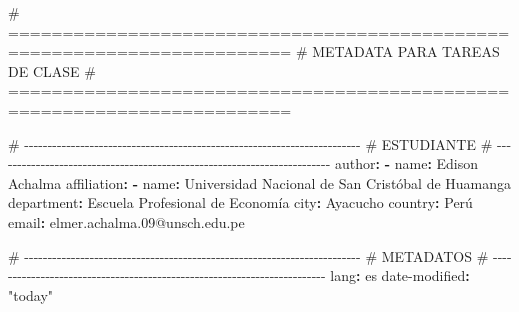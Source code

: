 \documentclass[
  doc,
  floatsintext,
  longtable,
  a4paper,
  nolmodern,
  notxfonts,
  notimes,
  12pt,
  colorlinks=true,linkcolor=blue,citecolor=blue,urlcolor=blue]{apa7}
\newenvironment{Shaded}{\begin{snugshade}}{\end{snugshade}}
\newcommand{\AttributeTok}[1]{\textcolor[rgb]{0.40,0.45,0.13}{#1}}
\newcommand{\CommentTok}[1]{\textcolor[rgb]{0.37,0.37,0.37}{#1}}
\newcommand{\FunctionTok}[1]{\textcolor[rgb]{0.28,0.35,0.67}{#1}}
\newcommand{\KeywordTok}[1]{\textcolor[rgb]{0.00,0.23,0.31}{\textbf{#1}}}
\newcommand{\StringTok}[1]{\textcolor[rgb]{0.13,0.47,0.30}{#1}}
\begin{document}
\begin{Shaded}
\begin{Highlighting}[]
\CommentTok{\# ========================================================================}
\CommentTok{\# METADATA PARA TAREAS DE CLASE}
\CommentTok{\# ========================================================================}

\CommentTok{\# {-}{-}{-}{-}{-}{-}{-}{-}{-}{-}{-}{-}{-}{-}{-}{-}{-}{-}{-}{-}{-}{-}{-}{-}{-}{-}{-}{-}{-}{-}{-}{-}{-}{-}{-}{-}{-}{-}{-}{-}{-}{-}{-}{-}{-}{-}{-}{-}{-}{-}{-}{-}{-}{-}{-}{-}{-}{-}{-}{-}{-}{-}{-}{-}{-}{-}{-}{-}{-}{-}{-}{-}}
\CommentTok{\# ESTUDIANTE}
\CommentTok{\# {-}{-}{-}{-}{-}{-}{-}{-}{-}{-}{-}{-}{-}{-}{-}{-}{-}{-}{-}{-}{-}{-}{-}{-}{-}{-}{-}{-}{-}{-}{-}{-}{-}{-}{-}{-}{-}{-}{-}{-}{-}{-}{-}{-}{-}{-}{-}{-}{-}{-}{-}{-}{-}{-}{-}{-}{-}{-}{-}{-}{-}{-}{-}{-}{-}{-}{-}{-}{-}{-}{-}{-}}
\FunctionTok{author}\KeywordTok{:}
\AttributeTok{  }\KeywordTok{{-}}\AttributeTok{ }\FunctionTok{name}\KeywordTok{:}\AttributeTok{ Edison Achalma}
\AttributeTok{    }\FunctionTok{affiliation}\KeywordTok{:}
\AttributeTok{      }\KeywordTok{{-}}\AttributeTok{ }\FunctionTok{name}\KeywordTok{:}\AttributeTok{ Universidad Nacional de San Cristóbal de Huamanga}
\AttributeTok{        }\FunctionTok{department}\KeywordTok{:}\AttributeTok{ Escuela Profesional de Economía}
\AttributeTok{        }\FunctionTok{city}\KeywordTok{:}\AttributeTok{ Ayacucho}
\AttributeTok{        }\FunctionTok{country}\KeywordTok{:}\AttributeTok{ Perú}
\AttributeTok{    }\FunctionTok{email}\KeywordTok{:}\AttributeTok{ elmer.achalma.09@unsch.edu.pe}

\CommentTok{\# {-}{-}{-}{-}{-}{-}{-}{-}{-}{-}{-}{-}{-}{-}{-}{-}{-}{-}{-}{-}{-}{-}{-}{-}{-}{-}{-}{-}{-}{-}{-}{-}{-}{-}{-}{-}{-}{-}{-}{-}{-}{-}{-}{-}{-}{-}{-}{-}{-}{-}{-}{-}{-}{-}{-}{-}{-}{-}{-}{-}{-}{-}{-}{-}{-}{-}{-}{-}{-}{-}{-}{-}}
\CommentTok{\# METADATOS}
\CommentTok{\# {-}{-}{-}{-}{-}{-}{-}{-}{-}{-}{-}{-}{-}{-}{-}{-}{-}{-}{-}{-}{-}{-}{-}{-}{-}{-}{-}{-}{-}{-}{-}{-}{-}{-}{-}{-}{-}{-}{-}{-}{-}{-}{-}{-}{-}{-}{-}{-}{-}{-}{-}{-}{-}{-}{-}{-}{-}{-}{-}{-}{-}{-}{-}{-}{-}{-}{-}{-}{-}{-}{-}{-}}
\FunctionTok{lang}\KeywordTok{:}\AttributeTok{ es}
\FunctionTok{date{-}modified}\KeywordTok{:}\AttributeTok{ }\StringTok{"today"}


\end{Highlighting}
\end{Shaded}
\end{document}
